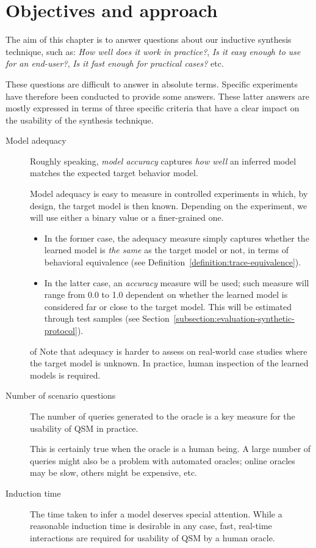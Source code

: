 \section{Objectives and approach\label{section:evaluation-objectives-and-approach}}

The aim of this chapter is to answer questions about our inductive synthesis technique, such as: \emph{How well does it work in practice?}, \emph{Is it easy enough to use for an end-user?}, \emph{Is it fast enough for practical cases?} etc. 

These questions are difficult to answer in absolute terms. Specific experiments have therefore been conducted to provide some answers. These latter answers are mostly expressed in terms of three specific criteria that have a clear impact on the usability of the synthesis technique.
\begin{description}
\item[Model adequacy] Roughly speaking, \emph{model accuracy} captures \emph{how well} an inferred model matches the expected target behavior model. 

Model adequacy is easy to measure in controlled experiments in which, by design, the target model is then known. Depending on the experiment, we will use either a binary value or a finer-grained one.
\begin{itemize}
\item In the former case, the adequacy measure simply captures whether the learned model is \emph{the same} as the target model or not, in terms of behavioral equivalence (see Definition~\ref{definition:trace-equivalence}).
\item In the latter case, an \emph{accuracy} measure will be used; such measure will range from 0.0 to 1.0 dependent on whether the learned model is considered far or close to the target model. This will be estimated through test samples (see Section~\ref{subsection:evaluation-synthetic-protocol}).
\end{itemize}
of 
Note that adequacy is harder to assess on real-world case studies where the target model is unknown. In practice, human inspection of the learned models is required.

\item[Number of scenario questions] The number of queries generated to the oracle is a key measure for the usability of QSM in practice. 

This is certainly true when the oracle is a human being. A large number of queries might also be a problem with automated oracles; online oracles may be slow, others might be expensive, etc.

\item[Induction time] The time taken to infer a model deserves special attention. While a reasonable induction time is desirable in any case, fast, real-time interactions are required for usability of QSM by a human oracle.
\end{description}

